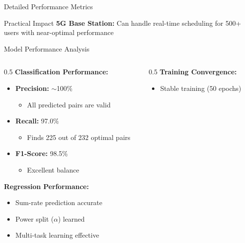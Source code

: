 \documentclass[aspectratio=169]{beamer}
\begin{document}
\begin{frame}{Detailed Performance Metrics}
    \vspace{0.3cm}
    
    \begin{exampleblock}{Practical Impact}
        \textbf{5G Base Station:} Can handle real-time scheduling for 500+ users with near-optimal performance
    \end{exampleblock}
\end{frame}

\begin{frame}{Model Performance Analysis} 
    \begin{columns}
        \begin{column}{0.5\textwidth}
            \textbf{Classification Performance:}
            \begin{itemize}
                \item \textbf{Precision:} $\sim$100\%
                \begin{itemize}
                    \item All predicted pairs are valid
                \end{itemize}
                \item \textbf{Recall:} 97.0\%
                \begin{itemize}
                    \item Finds 225 out of 232 optimal pairs
                \end{itemize}
                \item \textbf{F1-Score:} 98.5\%
                \begin{itemize}
                    \item Excellent balance
                \end{itemize}
            \end{itemize}
            
            
            
            \textbf{Regression Performance:}
            \begin{itemize}
                \item Sum-rate prediction accurate
                \item Power split ($\alpha$) learned
                \item Multi-task learning effective
            \end{itemize}
        \end{column}
        
        \begin{column}{0.5\textwidth}
            \textbf{Training Convergence:}
            \begin{itemize}
                \item Stable training (50 epochs)
            

\end{itemize}
\end{column}
\end{columns}
\end{frame}
\end{document}
